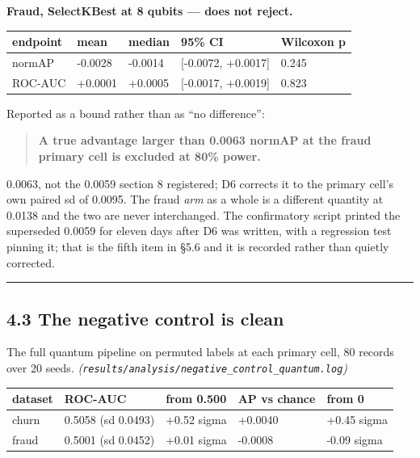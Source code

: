 \documentclass[
  10pt,
]{article}
\newcounter{none} %
\begin{document}
\textbf{Fraud, SelectKBest at 8 qubits --- does not reject.}

{\def\LTcaptype{none} %
\begin{longtable}[]{@{}lllll@{}}
\toprule\noalign{}
endpoint & mean & median & 95\% CI & Wilcoxon p \\
\midrule\noalign{}
\endhead
\bottomrule\noalign{}
\endlastfoot
normAP & -0.0028 & -0.0014 & {[}-0.0072, +0.0017{]} & 0.245 \\
ROC-AUC & +0.0001 & +0.0005 & {[}-0.0017, +0.0019{]} & 0.823 \\
\end{longtable}
}

Reported as a bound rather than as ``no difference'':

\begin{quote}
\textbf{A true advantage larger than 0.0063 normAP at the fraud primary
cell is excluded at 80\% power.}
\end{quote}

0.0063, not the 0.0059 section 8 registered; D6 corrects it to the
primary cell's own paired sd of 0.0095. The fraud \emph{arm} as a whole
is a different quantity at 0.0138 and the two are never interchanged.
The confirmatory script printed the superseded 0.0059 for eleven days
after D6 was written, with a regression test pinning it; that is the
fifth item in \S{}5.6 and it is recorded rather than quietly corrected.

\begin{center}\rule{0.5\linewidth}{0.5pt}\end{center}

\subsection{4.3 The negative control is
clean}\label{the-negative-control-is-clean}

The full quantum pipeline on permuted labels at each primary cell, 80
records over 20 seeds.
\emph{(\texttt{results/\allowbreak{}analysis/\allowbreak{}negative\_\allowbreak{}control\_\allowbreak{}quantum.log})}

{\def\LTcaptype{none} %
\begin{longtable}[]{@{}lllll@{}}
\toprule\noalign{}
dataset & ROC-AUC & from 0.500 & AP vs chance & from 0 \\
\midrule\noalign{}
\endhead
\bottomrule\noalign{}
\endlastfoot
churn & 0.5058 (sd 0.0493) & +0.52 sigma & +0.0040 & +0.45 sigma \\
fraud & 0.5001 (sd 0.0452) & +0.01 sigma & -0.0008 & -0.09 sigma \\
\end{longtable}
}
\end{document}
